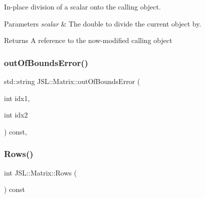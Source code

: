 In-\/place division of a scalar onto the calling object. 


\begin{DoxyParams}{Parameters}
{\em scalar} & The double to divide the current object by. \\
\hline
\end{DoxyParams}
\begin{DoxyReturn}{Returns}
A reference to the now-\/modified calling object 
\end{DoxyReturn}
\mbox{\label{classJSL_1_1Matrix_a92eb431da436e1e2922b211a9f158203}} 
\subsubsection{\texorpdfstring{out\+Of\+Bounds\+Error()}{outOfBoundsError()}}
{\footnotesize\ttfamily std\+::string J\+S\+L\+::\+Matrix\+::out\+Of\+Bounds\+Error (\begin{DoxyParamCaption}\item[{int}]{idx1,  }\item[{int}]{idx2 }\end{DoxyParamCaption}) const\hspace{0.3cm}{\ttfamily [inline]}, {\ttfamily [private]}}

\mbox{\label{classJSL_1_1Matrix_af784cad8dcbb502c06be62e2e328ef6c}} 
\subsubsection{\texorpdfstring{Rows()}{Rows()}}
{\footnotesize\ttfamily int J\+S\+L\+::\+Matrix\+::\+Rows (\begin{DoxyParamCaption}{ }\end{DoxyParamCaption}) const\hspace{0.3cm}{\ttfamily [inline]}}

\mbox{\label{classJSL_1_1Matrix_abcf44559767ab6939851f0d3b60c6fa8}} 

